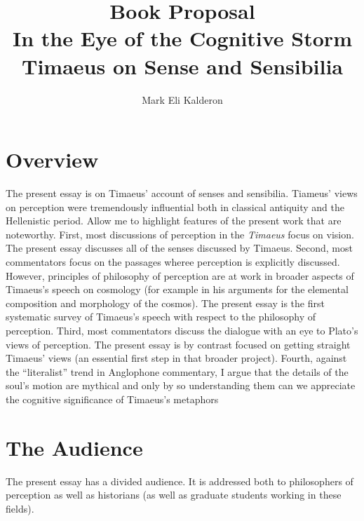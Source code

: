 \documentclass[12pt]{article}
\newcommand\myauthor{Mark Eli Kalderon}
\begin{document}
\author{\myauthor}
\title{Book Proposal\\
In the Eye of the Cognitive Storm\\
Timaeus on Sense and Sensibilia}
\date{}

\maketitle

\setlength{\parindent}{1em}


\section{Overview} %
\label{sec:overview}

The present essay is on Timaeus' account of senses and sensibilia. Tiameus' views on perception were tremendously influential both in classical antiquity and the Hellenistic period. Allow me to highlight features of the present work that are noteworthy. First, most discussions of perception in the \emph{Timaeus} focus on vision. The present essay discusses all of the senses discussed by Timaeus. Second, most commentators focus on the passages wheree perception is explicitly discussed. However, principles of philosophy of perception are at work in broader aspects of Timaeus's speech on cosmology (for example in his arguments for the elemental composition and morphology of the cosmos). The present essay is the first systematic survey of Timaeus's speech with respect to the philosophy of perception. Third, most commentators discuss the dialogue with an eye to Plato's views of perception. The present essay is by contrast focused on getting straight Timaeus' views (an essential first step in that broader project). Fourth, against the ``literalist'' trend in Anglophone commentary, I argue that the details of the soul's motion are mythical and only by so understanding them can we appreciate the cognitive significance of Timaeus's metaphors


\section{The Audience} %
\label{sec:the_audience}

The present essay has a divided audience. It is addressed both to philosophers of perception as well as historians (as well as graduate students working in these fields). 
\end{document}
